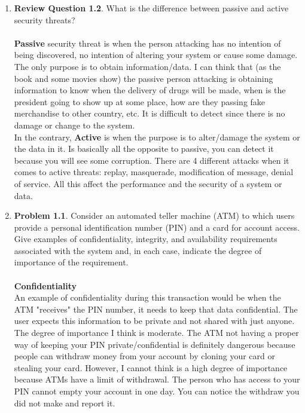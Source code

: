 \documentclass[12pt]{article}
\begin{document}
\renewcommand{\headrulewidth}{0.4pt}

\vspace{-3mm}

\begin{enumerate}

	\item {\textbf{Review Question 1.2}. What is the difference between passive and active security threats?} \\\\
	\textbf{Passive}  security threat is when the person attacking has no intention of being discovered, no intention of altering your system or cause some damage. The only purpose is to obtain information/data. I can think that (as the book and some movies show) the passive person attacking is obtaining information to know when the delivery of drugs will be made, when is the president going to show up at some place, how are they passing fake merchandise to other country, etc. It is difficult to detect since there is no damage or change to the system.\\ In the contrary, \textbf{Active} is when the purpose is to alter/damage the system or the data in it. Is basically all the opposite to passive, you can detect it because you will see some corruption. There are 4 different attacks when it comes to active threats: replay, masquerade, modification of message, denial of service. All this affect the performance and the security of a system or data. 
	
	\vspace{40pt}
	
	
	\item {\textbf{Problem 1.1}. Consider an automated teller machine (ATM) to which users provide a personal identification number (PIN) and a card for account access. Give examples of confidentiality, integrity, and availability requirements associated with the system and, in each case, indicate the degree of importance of the requirement.}
	\\\\
	\textbf{Confidentiality}\\ An example of confidentiality during this transaction would be when the ATM "receives" the PIN number, it needs to keep that data confidential. The user expects this information to be private and not shared with just anyone. The degree of importance I think is moderate. The ATM not having a proper way of keeping your PIN private/confidential is definitely dangerous because people can withdraw money from your account by cloning your card or stealing your card. However, I cannot think is a high degree of importance because ATMs have a limit of withdrawal. The person who has access to your PIN cannot empty your account in one day. You can notice the withdraw you did not make and report it.\\
	

\end{enumerate}
\end{document}
